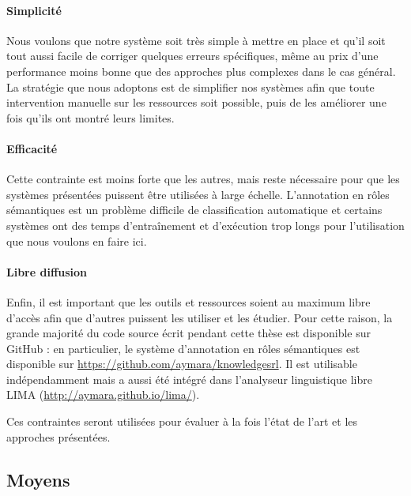 \paragraph{Simplicité} Nous voulons que notre système soit très simple à mettre
en place et qu'il soit tout aussi facile de corriger quelques erreurs
spécifiques, même au prix d'une performance moins bonne que des approches plus
complexes dans le cas général. La stratégie que nous adoptons est de simplifier
nos systèmes afin que toute intervention manuelle sur les ressources soit
possible, puis de les améliorer une fois qu'ils ont montré leurs limites.

\paragraph{Efficacité} Cette contrainte est moins forte que les autres, mais
reste nécessaire pour que les systèmes présentées puissent être utilisées à
large échelle. L'annotation en rôles sémantiques est un problème difficile de
classification automatique et certains systèmes ont des temps d'entraînement et
d'exécution trop longs pour l'utilisation que nous voulons en faire ici.

\paragraph{Libre diffusion} Enfin, il est important que les outils et
ressources soient au maximum libre d'accès afin que d'autres puissent les
utiliser et les étudier. Pour cette raison, la grande majorité du code source
écrit pendant cette thèse est disponible sur GitHub : en particulier, le
système d'annotation en rôles sémantiques est disponible sur
\url{https://github.com/aymara/knowledgesrl}. Il est utilisable indépendamment
mais a aussi été intégré dans l'analyseur linguistique libre LIMA
(\url{http://aymara.github.io/lima/}).

Ces contraintes seront utilisées pour évaluer à la fois l'état de l'art et les
approches présentées.

\subsection{Moyens}
\label{objectifs_these}


